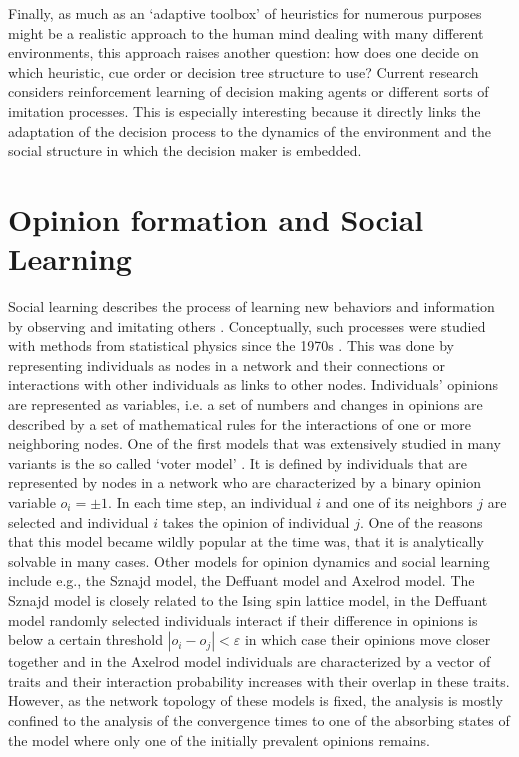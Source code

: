 Finally, as much as an `adaptive toolbox' of heuristics for numerous purposes might be a realistic approach to the human mind dealing with many different environments, this approach raises another question: how does one decide on which heuristic, cue order or decision tree structure to use? Current research \citep{garcia2009does,Rieskamp2006} considers reinforcement learning of decision making agents or different sorts of imitation processes. This is especially interesting because it directly links the adaptation of the decision process to the dynamics of the environment and the social structure in which the decision maker is embedded.\\

\section{Opinion formation and Social Learning}
Social learning describes the process of learning new behaviors and information by observing and imitating others \citep{Bandura1971}. 
Conceptually, such processes were studied with methods from statistical physics since the 1970s \citep[for a review see e.g.][]{castellano2009statistical}. This was done by representing individuals as nodes in a network and their connections or interactions with other individuals as links to other nodes. Individuals' opinions are represented as  variables, i.e. a set of numbers and changes in opinions are described by a set of mathematical rules for the interactions of one or more neighboring nodes. One of the first models that was extensively studied in many variants is the so called `voter model' \citep{Clifford1973, Holley1975}. It is defined by individuals that are represented by nodes in a network who are characterized by a binary opinion variable $o_i = \pm 1$. In each time step, an individual $i$ and one of its neighbors $j$ are selected and individual $i$ takes the opinion of individual $j$. One of the reasons that this model became wildly popular at the time was, that it is analytically solvable in many cases. 
Other models for opinion dynamics and social learning include e.g., the Sznajd model, the Deffuant model and Axelrod model. The Sznajd model \citep{Sznajd-Weron2000} is closely related to the Ising spin lattice model, in the Deffuant model \citep{Deffuant2000} randomly selected individuals interact if their difference in opinions is below a certain threshold $|o_i - o_j| < \varepsilon$ in which case their opinions move closer together and in the Axelrod model \citep{Axelrod1997} individuals are characterized by a vector of traits and their interaction probability increases with their overlap in these traits. However, as the network topology of these models is fixed, the analysis is mostly confined to the analysis of the convergence times to one of the absorbing states of the model where only one of the initially prevalent opinions remains.\\
